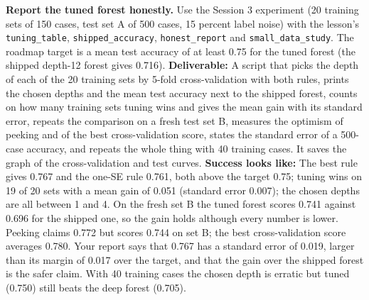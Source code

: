 \documentclass[11pt,a4paper]{article}
\begin{document}
\textbf{Report the tuned forest honestly.} Use the Session 3 experiment (20 training sets of 150 cases, test set A of 500 cases, 15 percent label noise) with the lesson's \texttt{tuning\_table}, \texttt{shipped\_accuracy}, \texttt{honest\_report} and \texttt{small\_data\_study}. The roadmap target is a mean test accuracy of at least 0.75 for the tuned forest (the shipped depth-12 forest gives 0.716). \textbf{Deliverable:} A script that picks the depth of each of the 20 training sets by 5-fold cross-validation with both rules, prints the chosen depths and the mean test accuracy next to the shipped forest, counts on how many training sets tuning wins and gives the mean gain with its standard error, repeats the comparison on a fresh test set B, measures the optimism of peeking and of the best cross-validation score, states the standard error of a 500-case accuracy, and repeats the whole thing with 40 training cases. It saves the graph of the cross-validation and test curves. \textbf{Success looks like:} The best rule gives 0.767 and the one-SE rule 0.761, both above the target 0.75; tuning wins on 19 of 20 sets with a mean gain of 0.051 (standard error 0.007); the chosen depths are all between 1 and 4. On the fresh set B the tuned forest scores 0.741 against 0.696 for the shipped one, so the gain holds although every number is lower. Peeking claims 0.772 but scores 0.744 on set B; the best cross-validation score averages 0.780. Your report says that 0.767 has a standard error of 0.019, larger than its margin of 0.017 over the target, and that the gain over the shipped forest is the safer claim. With 40 training cases the chosen depth is erratic but tuned (0.750) still beats the deep forest (0.705).
\end{document}
